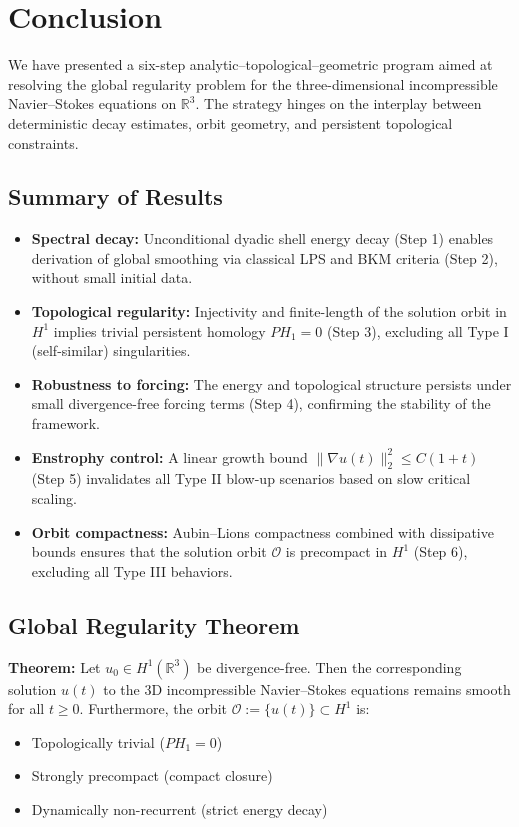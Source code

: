 \documentclass[11pt]{article}
\theoremstyle{definition}
\begin{document}
\section{Conclusion}
\label{sec:conclusion}

We have presented a six-step analytic–topological–geometric program aimed at resolving the global regularity problem for the three-dimensional incompressible Navier–Stokes equations on \( \mathbb{R}^3 \). The strategy hinges on the interplay between deterministic decay estimates, orbit geometry, and persistent topological constraints.

\subsection*{Summary of Results}
\begin{itemize}
  \item \textbf{Spectral decay:} Unconditional dyadic shell energy decay (Step 1) enables derivation of global smoothing via classical LPS and BKM criteria (Step 2), without small initial data.

  \item \textbf{Topological regularity:} Injectivity and finite-length of the solution orbit in \( H^1 \) implies trivial persistent homology \( PH_1 = 0 \) (Step 3), excluding all Type I (self-similar) singularities.

  \item \textbf{Robustness to forcing:} The energy and topological structure persists under small divergence-free forcing terms (Step 4), confirming the stability of the framework.

  \item \textbf{Enstrophy control:} A linear growth bound \( \|\nabla u(t)\|_2^2 \le C(1 + t) \) (Step 5) invalidates all Type II blow-up scenarios based on slow critical scaling.

  \item \textbf{Orbit compactness:} Aubin–Lions compactness combined with dissipative bounds ensures that the solution orbit \( \mathcal{O} \) is precompact in \( H^1 \) (Step 6), excluding all Type III behaviors.
\end{itemize}

\subsection*{Global Regularity Theorem}
\textbf{Theorem:} Let \( u_0 \in H^1(\mathbb{R}^3) \) be divergence-free. Then the corresponding solution \( u(t) \) to the 3D incompressible Navier–Stokes equations remains smooth for all \( t \ge 0 \). Furthermore, the orbit \( \mathcal{O} := \{ u(t) \} \subset H^1 \) is:
\begin{itemize}
  \item Topologically trivial (\( PH_1 = 0 \))
  \item Strongly precompact (compact closure)
  \item Dynamically non-recurrent (strict energy decay)
\end{itemize}
\end{document}
